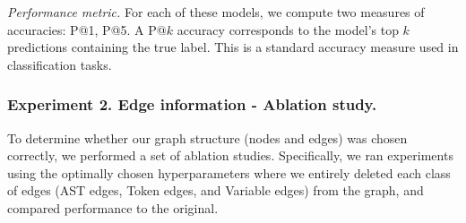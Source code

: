 \textit{Performance metric.} For each of these models, we compute two measures of accuracies: \textsc{P@1}, \textsc{P@5}. A \textsc{P@}$k$ accuracy corresponds to the model's top $k$ predictions containing the true label. This is a standard accuracy measure used in classification tasks.

\subsubsection{Experiment 2. Edge information - Ablation study.}
To determine whether our graph structure (nodes and edges) was chosen correctly, we performed a set of ablation studies.
Specifically, we ran experiments using the optimally chosen hyperparameters where we entirely deleted each class of edges (AST edges, Token edges, and Variable edges) from the graph, and compared performance to the original.

